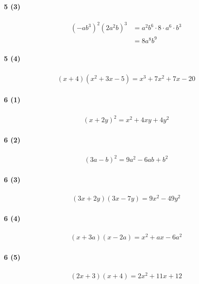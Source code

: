 \documentclass[fleqn,a4j,dvipdfmx,uplatex,twocolumn]{jsarticle}
\begin{document}
\paragraph{5 (3)}
\begin{align*}
  (-a b^{3})^{2}(2 a^{2} b)^{3} &= a^{2} b^{6} \cdot 8 \cdot a^{6} \cdot b^{3} \\
  &= 8 a^{8} b^{9}
\end{align*}

\paragraph{5 (4)}
\begin{align*}
  (x+4)(x^{2}+3 x-5)= x^{3}+7 x^{2}+7 x-20
\end{align*}

\paragraph{6 (1)}
\begin{align*}
  (x+2 y)^{2} = x^{2}+4 x y+4 y^{2}
\end{align*}

\paragraph{6 (2)}
\begin{align*}
  (3 a-b)^{2} = 9 a^{2}-6 a b+b^{2}
\end{align*}

\paragraph{6 (3)}
\begin{align*}
  (3 x+2 y)(3 x-7 y)= 9 x^{2}-49 y^{2}
\end{align*}

\paragraph{6 (4)}
\begin{align*}
  (x+3 a)(x-2 a)= x^{2}+a x-6 a^{2}
\end{align*}

\paragraph{6 (5)}
\begin{align*}
  (2 x+3)(x+4)= 2 x^{2}+11 x+12
\end{align*}
\end{document}
